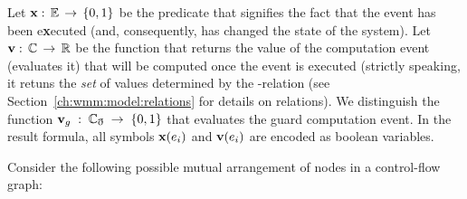 Let $\mathbf{x}:\,\mathbb{E}\,\rightarrow\,\{0,1\}$ be the predicate that signifies the fact that the event has been e\textbf{x}ecuted (and, consequently, has changed the state of the system).
Let $\mathbf{v}:\,\mathbb{C}\,\rightarrow\,\mathbb{R}$ be the function that returns the value of the computation event (evaluates it) that will be computed once the event is executed (strictly speaking, it retuns the \textit{set} of values determined by the \rf-relation (see Section~\ref{ch:wmm:model:relations} for details on relations).
We distinguish the function ${\mathbf{v}_g\;:\;\mathbb{C_g}\;\rightarrow\;\{0,1\}}$ that evaluates the guard computation event. In the result formula, all symbols $\mathbf{x}(e_i)$ and $\mathbf{v}(e_i)$ are encoded as boolean variables.

Consider the following possible mutual arrangement of nodes in a control-flow graph:


